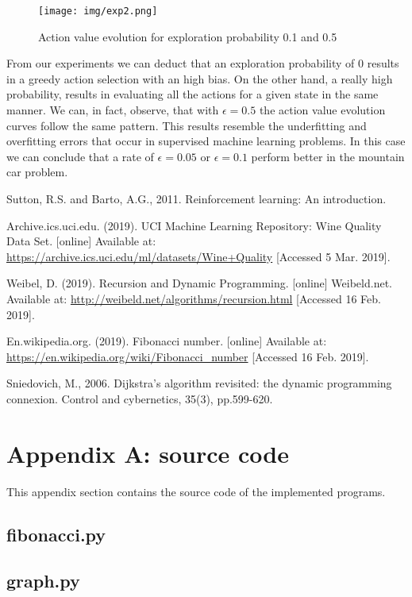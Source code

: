 \documentclass[runningheads]{llncs}
\begin{document}
\begin{figure}
\texttt{[image: img/exp2.png]}
\caption{Action value evolution for exploration probability 0.1 and 0.5} \label{exp2}
\end{figure}
From our experiments we can deduct that an exploration probability of
$0$ results in a greedy action selection with an high bias. On the
other hand, a really high probability, results in evaluating all the
actions for a given state in the same manner. We can, in fact,
observe, that with $\epsilon = 0.5$ the action value evolution curves
follow the same pattern. This results resemble the underfitting and
overfitting errors that occur in supervised machine learning
problems. In this case we can conclude that a rate of $\epsilon =
0.05$ or $\epsilon = 0.1$ perform better in the mountain car problem.

\begin{thebibliography}{8}

Sutton, R.S. and Barto, A.G., 2011. Reinforcement learning: An introduction.

Archive.ics.uci.edu. (2019). UCI Machine Learning Repository: Wine Quality Data Set. [online] Available at: \url{https://archive.ics.uci.edu/ml/datasets/Wine+Quality} [Accessed 5 Mar. 2019].

Weibel, D. (2019). Recursion and Dynamic Programming. [online] Weibeld.net. Available at: \url{http://weibeld.net/algorithms/recursion.html} [Accessed 16 Feb. 2019].

En.wikipedia.org. (2019). Fibonacci number. [online] Available at: \url{https://en.wikipedia.org/wiki/Fibonacci\_number} [Accessed 16 Feb. 2019].

Sniedovich, M., 2006. Dijkstra's algorithm revisited: the dynamic programming connexion. Control and cybernetics, 35(3), pp.599-620.

\end{thebibliography}


\section{Appendix A: source code}\label{appendix}
This appendix section contains the source code of the implemented programs.

\subsection{fibonacci.py}\label{fibonacci_code}

\subsection{graph.py}\label{graph_code}
\end{document}
